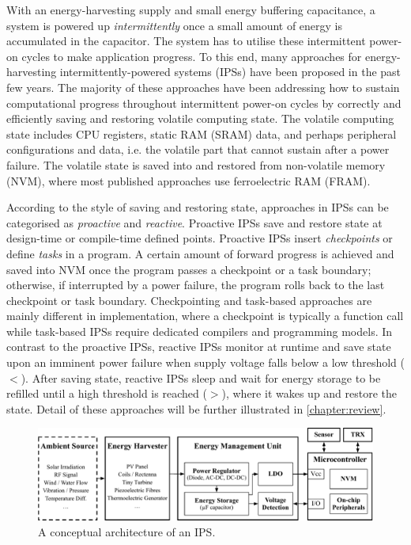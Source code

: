 
With an energy-harvesting supply and small energy buffering capacitance, a system is powered up \textit{intermittently} once a small amount of energy is accumulated in the capacitor. 
The system has to utilise these intermittent power-on cycles to make application progress. 
To this end, many approaches for energy-harvesting intermittently-powered systems (IPSs) have been proposed in the past few years. 
The majority of these approaches have been addressing how to sustain computational progress throughout intermittent power-on cycles by correctly and efficiently saving and restoring volatile computing state. 
The volatile computing state includes CPU registers, static RAM (SRAM) data, and perhaps peripheral configurations and data, i.e. the volatile part that cannot sustain after a power failure. 
The volatile state is saved into and restored from non-volatile memory (NVM), where most published approaches use ferroelectric RAM (FRAM). 

According to the style of saving and restoring state, approaches in IPSs can be categorised as \textit{proactive} and \textit{reactive}. 
Proactive IPSs save and restore state at design-time or compile-time defined points. 
Proactive IPSs insert \textit{checkpoints} or define \textit{tasks} in a program. 
A certain amount of forward progress is achieved and saved into NVM once the program passes a checkpoint or a task boundary; otherwise, if interrupted by a power failure, the program rolls back to the last checkpoint or task boundary. 
Checkpointing and task-based approaches are mainly different in implementation, where a checkpoint is typically a function call while task-based IPSs require dedicated compilers and programming models. 
In contrast to the proactive IPSs, reactive IPSs monitor  at runtime and save state upon an imminent power failure when supply voltage falls below a low threshold ($<$). 
After saving state, reactive IPSs sleep and wait for energy storage to be refilled until a high threshold is reached ($>$), where it wakes up and restore the state. 
Detail of these approaches will be further illustrated in \cref{chapter:review}.

\begin{figure}
  \centering
  \includegraphics[width=\columnwidth]{ch1_intro/figures/IPSarch}
  \caption{A conceptual architecture of an IPS.}
  \label{fig:ips_arch}
\end{figure}

